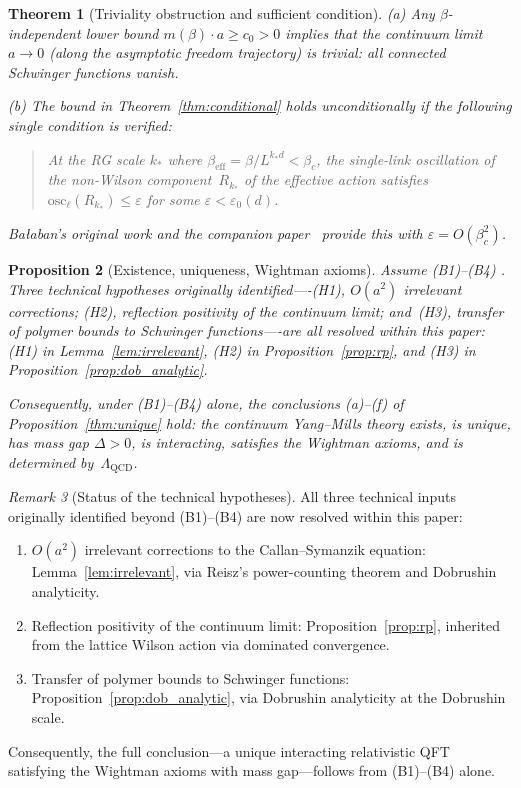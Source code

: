 \documentclass[11pt,a4paper]{article}
\theoremstyle{plain}
\newtheorem{theorem}{Theorem}[section]
\newtheorem{proposition}[theorem]{Proposition}
\theoremstyle{definition}
\theoremstyle{remark}
\newtheorem{remark}[theorem]{Remark}
\newcommand{\osc}{\mathrm{osc}}
\begin{document}
\begin{theorem}[Triviality obstruction and sufficient
condition]\label{thm:obstruction}
\textup{(a)} Any $\beta$-independent lower bound
$m(\beta) \cdot a \geq c_0 > 0$ implies that the continuum
limit $a \to 0$ (along the asymptotic freedom trajectory)
is trivial: all connected Schwinger functions vanish.

\textup{(b)} The bound in Theorem~\ref{thm:conditional}
holds unconditionally if the following single condition
is verified:
\begin{quote}
\emph{At the RG scale $k_*$ where
$\beta_{\mathrm{eff}} = \beta / L^{k_* d} < \beta_c$,
the single-link oscillation of the non-Wilson
component~$R_{k_*}$ of the effective action satisfies
$\osc_\ell(R_{k_*}) \leq \varepsilon$ for some
$\varepsilon < \varepsilon_0(d)$.}
\end{quote}
Ba{\l}aban's original work and the companion
paper~\cite{FontesSU2} provide this with
$\varepsilon = O(\beta_c^2)$.
\end{theorem}

\begin{proposition}[Existence, uniqueness,
Wightman axioms]\label{thm:full}
Assume (B1)--(B4) \cite{FontesSU2}.
Three technical hypotheses originally identified----(H1),
$O(a^2)$ irrelevant corrections; (H2), reflection
positivity of the continuum limit; and~(H3), transfer
of polymer bounds to Schwinger functions----are all
resolved within this paper:
\textup{(H1)} in Lemma~\ref{lem:irrelevant},
\textup{(H2)} in Proposition~\ref{prop:rp},
and \textup{(H3)} in
Proposition~\ref{prop:dob_analytic}.

Consequently, under (B1)--(B4) \cite{FontesSU2} alone,
the conclusions \textup{(a)--(f)} of
Proposition~\ref{thm:unique} hold: the continuum
Yang--Mills theory exists, is unique, has mass gap
$\Delta > 0$, is interacting, satisfies the Wightman
axioms, and is determined by~$\Lambda_{\mathrm{QCD}}$.
\end{proposition}

\begin{remark}[Status of the technical hypotheses]
All three technical inputs originally identified beyond
(B1)--(B4) \cite{FontesSU2} are now resolved within this paper:
\begin{enumerate}[label=\textup{(H\arabic*)},nosep]
  \item $O(a^2)$ irrelevant corrections to the
    Callan--Symanzik equation: Lemma~\ref{lem:irrelevant},
    via Reisz's power-counting theorem and Dobrushin
    analyticity.
  \item Reflection positivity of the continuum limit:
    Proposition~\ref{prop:rp}, inherited from the
    lattice Wilson action via dominated convergence.
  \item Transfer of polymer bounds to Schwinger functions:
    Proposition~\ref{prop:dob_analytic}, via Dobrushin
    analyticity at the Dobrushin scale.
\end{enumerate}
Consequently, the full conclusion---a unique interacting
relativistic QFT satisfying
the Wightman axioms with mass gap---follows from
(B1)--(B4) \cite{FontesSU2} alone.
\end{remark}
\end{document}

